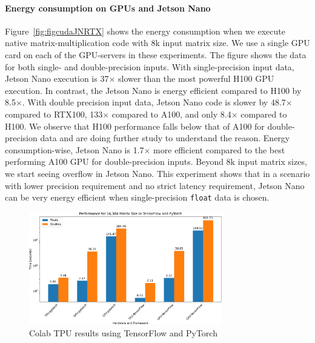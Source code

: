 \paragraph{Energy consumption on GPUs and Jetson Nano} 
Figure~\ref{fig:figcudaJNRTX} shows the energy consumption when we execute native matrix-multiplication code with 8k input matrix size. We use a single GPU card on each of the GPU-servers in these experiments. The figure shows the data for both single- and double-precision inputs. With single-precision input data, Jetson Nano execution is 37$\times$ slower than the most powerful H100 GPU execution. In contrast, the Jetson Nano is energy efficient compared to H100 by 8.5$\times$. With double precision input data,  Jetson Nano code is slower by 48.7$\times$ compared to RTX100, 133$\times$ compared to A100, and only 8.4$\times$ compared to H100. We observe that H100 performance falls below that of A100 for double-precision data and are doing further study to understand the reason. Energy consumption-wise, Jetson Nano is 1.7$\times$ more efficient compared to the best performing A100 GPU for double-precision inputs. Beyond 8k input matrix sizes, we start seeing overflow in Jetson Nano. This experiment shows that in a scenario with lower precision requirement and no strict latency requirement, Jetson Nano can be very energy efficient when single-precision \texttt{float} data is chosen.    

%
\begin{figure}[h]
    \centering
    \includegraphics[width=0.75\textwidth]{Images/TF&Py-crop.pdf}
    \caption{Colab TPU results using TensorFlow and PyTorch}
    \label{fig:TPU}
\end{figure}
